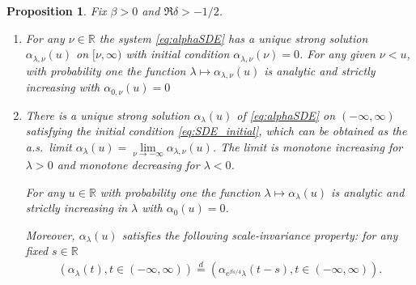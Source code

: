 \documentclass[12pt]{article}
\newtheorem{proposition}[theorem]{Proposition}
\theoremstyle{definition} %
\newcommand{\R}{{\mathbb R}}
\theoremstyle{remark} %
\newcommand{\ed}{\stackrel{d}{=}}
\newcommand{\benedek}[1]{\textcolor{red}{\tt{#1}}}
\begin{document}
\begin{proposition}\label{prop:alphaSDE}Fix $\beta>0$ and $\Re \delta>-1/2$. 


\begin{enumerate}
    \item For any $\nu\in \R$ the system \eqref{eq:alphaSDE} has a unique strong solution $\alpha_{\lambda,\nu}(u)$ on $[\nu,\infty)$ with initial condition $\alpha_{\lambda,\nu}(\nu)=0$. For any given $\nu< u$, with probability one the function $\lambda\mapsto \alpha_{\lambda,\nu}(u)$ is analytic and strictly increasing with $\alpha_{0,\nu}(u)=0$ 


    \item There is a unique strong solution $\alpha_\lambda(u)$ of \eqref{eq:alphaSDE} on $(-\infty,\infty)$ satisfying the initial condition \eqref{eq:SDE_initial}, which  can be obtained as the a.s.~limit $\alpha_\lambda(u)=\lim\limits_{\nu\to -\infty} \alpha_{\lambda,\nu}(u)$. The limit is monotone increasing for $\lambda>0$ and monotone decreasing for $\lambda<0$. 
    
    For any $u\in \R$ with probability one the function $\lambda\mapsto \alpha_\lambda(u)$ is analytic and strictly increasing in $\lambda$ with $\alpha_0(u)=0$. 

    Moreover, $\alpha_\lambda(u)$ satisfies the following scale-invariance property: for any fixed $s\in \R$ 
\begin{align}\label{eq:scale_inv}
    \left(\alpha_\lambda(t), t\in (-\infty,\infty)\right) \ed  \left(\alpha_{e^{\beta s/4}\lambda}(t-s), t\in (-\infty,\infty)\right). 
\end{align}  
\end{enumerate}
\end{proposition}



\end{document}
